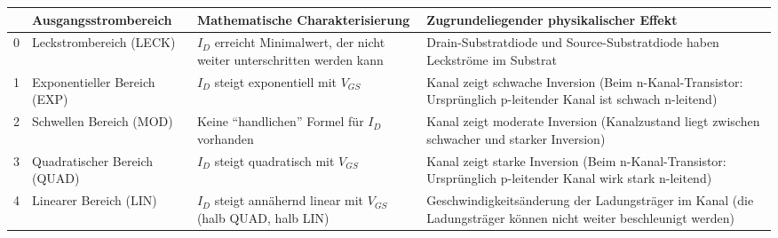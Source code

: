 
\begin{tabular}{|lp{3cm}|p{6cm}|p{8cm}|}
	\hline
	& \textbf{Ausgangs\-strom\-bereich} & \textbf{Mathematische Charakterisierung} & \textbf{Zugrundeliegender physikalischer Effekt}
	\\ \hline
	\cellcolor{red!70}
	0 
	& Leckstrombereich (LECK) 
	& $I_D$ erreicht Minimalwert, der nicht weiter unterschritten werden kann
	& Drain-Substratdiode und Source-Substratdiode haben Leckströme im Substrat
	\\ \hline
	\cellcolor{orange!70}
	1
	& Exponentieller Bereich (EXP)
	& $I_D$ steigt exponentiell mit $V_{GS}$
	& Kanal zeigt schwache Inversion (Beim n-Kanal-Transistor: Ursprünglich p-leitender Kanal ist schwach n-leitend)
	\\ \hline
	\cellcolor{yellow!70}
	2
	& Schwellen Bereich (MOD)
	& Keine "`handlichen"' Formel für $I_D$ vorhanden
	& Kanal zeigt moderate Inversion (Kanalzustand liegt zwischen schwacher und starker Inversion)
	\\ \hline
	\cellcolor{green!70}
	3
	& Quadratischer Bereich (QUAD)
	& $I_D$ steigt quadratisch mit $V_{GS}$
	& Kanal zeigt starke Inversion (Beim n-Kanal-Transistor: Ursprünglich p-leitender Kanal wirk stark n-leitend)
	\\ \hline
	\cellcolor{blue!70}
	4
	& Linearer Bereich (LIN)
	& $I_D$ steigt annähernd linear mit $V_{GS}$ (halb QUAD, halb LIN)
	& Geschwindigkeitsänderung der Ladungsträger im Kanal (die Ladungsträger können nicht weiter beschleunigt werden)
	\\ \hline
\end{tabular}
\resetArrayStretch


